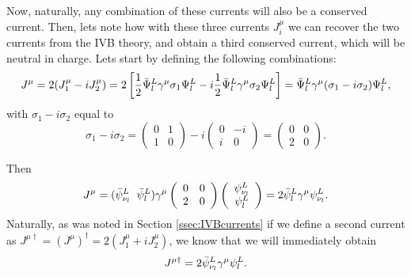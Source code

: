 Now, naturally, any combination of these currents will also be a conserved current. Then, lets note how with these three currents $J^{\mu}_i$ we can recover the two currents from the IVB theory, and obtain a third conserved current, which will be neutral in charge. Lets start by defining the following combinations:
\begin{align*}
    J^{\mu} = 2(J^{\mu}_1 - iJ^{\mu}_2) = 2\left[ \dfrac{1}{2}\Bar{\Psi}^L_l\gamma^{\mu}\sigma_1\Psi^L_l - i\dfrac{1}{2}\Bar{\Psi}^L_l\gamma^{\mu}\sigma_2\Psi^L_l \right] = \Bar{\Psi}^L_l\gamma^{\mu}(\sigma_1 - i\sigma_2)\Psi^L_l,
\end{align*}
with $\sigma_1-i\sigma_2$ equal to
\begin{equation*}
    \sigma_1-i\sigma_2 = \left( \begin{array}{ccc}
0 & 1 \\
1 & 0 \end{array} \right) -i\left( \begin{array}{ccc}
0 & -i \\
i & 0 \end{array} \right) = \left( \begin{array}{ccc}
0 & 0 \\
2 & 0 \end{array} \right).
\end{equation*}

Then
\begin{equation*}
    J^{\mu} = (\Bar{\psi}^L_{\nu_l} \;\; \Bar{\psi}^L_l)\gamma^{\mu}\left( \begin{array}{ccc}
0 & 0 \\
2 & 0 \end{array} \right)  \left( \begin{array}{c}
    \psi^L_{\nu_l} \\
    \psi^L_l\end{array} \right) = 2\Bar{\psi}^L_l\gamma^{\mu}\psi^L_{\nu_l}.
\end{equation*}
Naturally, as was noted in Section \ref{ssec:IVBcurrents} if we define a second current as $J^{\mu\dagger} = (J^{\mu})^{\dagger} = 2(J^{\mu}_1 + iJ^{\mu}_2)$, we know that we will immediately obtain
\begin{equation*}
    J^{\mu\dagger} = 2\Bar{\psi}^L_{\nu_l}\gamma^{\mu}\psi^L_l.
\end{equation*}

